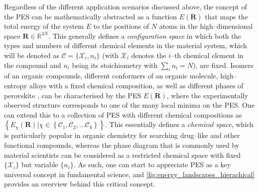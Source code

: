 Regardless of the different application scenarios discussed above, the concept of the PES can be  mathematically abstracted as a function $E(\bm{R})$ that maps the total energy of the system $E$ to the positions of $N$ atoms in the high--dimensional space $\bm{R}\in \mathbb{R}^{3N}$.  This generally defines a \emph{configuration space} in which both the types and numbers of different chemical elements in the material system, which will be denoted as $\mathcal{C}=\{\mathcal{X}_i,n_{i}\}$ (with $\mathcal{X}_i$ denotes the $i$--th chemical element in the compound and $n_i$ being its stoichiometry with $\sum_i n_i=N$), are fixed. Isomers of an organic compounds, different conformers of an organic molecule, high--entropy alloys with a fixed chemical composition, as well as different phases of perovskite , can be characterised by the PES $E(\bm{R})$, where the experimentally observed structure corresponds to one of the many local minima on the PES. One can extend this to a collection of PES with different chemical compositions as $\left\{E_\chi(\bm{R})\vert \chi\in  \left\{\mathcal{C}_1,\mathcal{C}_2,\ldots\mathcal{C}_{k} \right\} \right\}$. This essentially defines a \emph{chemical space}, which is particularly popular in organic chemistry for searching drug--like and other functional compounds,\cite{reymond2015chemical,gomez2018automatic} whereas the phase diagram that is commonly used by material scientists can be considered as a restricted chemical space with fixed $\{\mathcal{X}_i\}$ but variable $\{n_i\}$.  As such, one can start to appreciate PES as a key universal concept in fundamental science, and  \cref{fig:energy_landscapes_hierachical} provides an overview behind this critical concept. 

